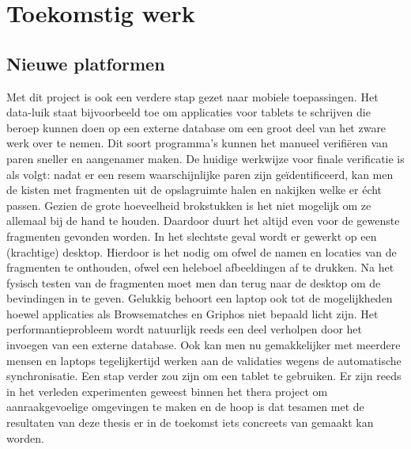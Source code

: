 \chapter{Toekomstig werk}
\label{toekomst}

\section{Nieuwe platformen}
Met dit project is ook een verdere stap gezet naar mobiele toepassingen. Het data-luik staat bijvoorbeeld toe om applicaties voor tablets te schrijven die beroep kunnen doen op een externe database om een groot deel van het zware werk over te nemen. Dit soort programma's kunnen het manueel verifi\"eren van paren sneller en aangenamer maken. De huidige werkwijze voor finale verificatie is als volgt: nadat er een resem waarschijnlijke paren zijn ge\"identificeerd, kan men de kisten met fragmenten uit de opslagruimte halen en nakijken welke er \'echt passen. Gezien de grote hoeveelheid brokstukken is het niet mogelijk om ze allemaal bij de hand te houden. Daardoor duurt het altijd even voor de gewenste fragmenten gevonden worden. In het slechtste geval wordt er gewerkt op een (krachtige) desktop. Hierdoor is het nodig om ofwel de namen en locaties van de fragmenten te onthouden, ofwel een heleboel afbeeldingen af te drukken. Na het fysisch testen van de fragmenten moet men dan terug naar de desktop om de bevindingen in te geven. Gelukkig behoort een laptop ook tot de mogelijkheden hoewel applicaties als Browsematches en Griphos niet bepaald licht zijn. Het performantieprobleem wordt natuurlijk reeds een deel verholpen door het invoegen van een externe database. Ook kan men nu gemakkelijker met meerdere mensen en laptops tegelijkertijd werken aan de validaties wegens de automatische synchronisatie. Een stap verder zou zijn om een tablet te gebruiken. Er zijn reeds in het verleden experimenten geweest binnen het thera project om aanraakgevoelige omgevingen te maken en de hoop is dat tesamen met de resultaten van deze thesis er in de toekomst iets concreets van gemaakt kan worden.\\

